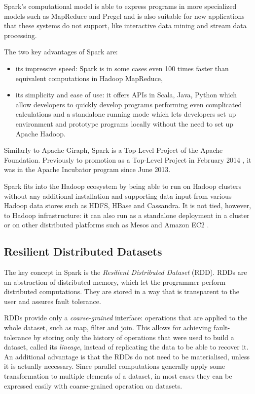 Spark's computational model is able to express programs in more specialized models such as MapReduce and Pregel and is also suitable for new applications that these systems do not support, like interactive data mining and stream data processing.

The two key advantages of Spark are:
\begin{itemize}
\item its impressive speed: Spark is in some cases even 100 times faster than equivalent computations in Hadoop MapReduce,
\item its simplicity and ease of use: it offers  APIs in Scala, Java, Python which allow developers to quickly develop programs performing even complicated calculations and a standalone running mode which lets developers set up environment and prototype programs locally without the need to set up Apache Hadoop.
\end{itemize}

Similarly to Apache Giraph, Spark is a Top-Level Project of the Apache Foundation. Previously to promotion as a Top-Level Project in February 2014 \cite{sparktoplevel}, it was in the Apache Incubator program since June 2013. 

Spark fits into the Hadoop ecosystem by being able to run on Hadoop clusters without any additional installation and supporting data input from various Hadoop data stores such as HDFS, HBase and Cassandra. It is not tied, however, to Hadoop infrastructure: it can also run as a standalone deployment in a cluster or on other distributed platforms such as Mesos \cite{mesos} and Amazon EC2 \cite{ec2}.

\subsection{Resilient Distributed Datasets}
The key concept in Spark is the \emph{Resilient Distributed Dataset} (RDD). RDDs are an abstraction of distributed memory, which let the programmer perform distributed computations. They are stored in a way that is transparent to the user and assures fault tolerance.

RDDs provide only a \emph{coarse-grained} interface: operations that are applied to the whole dataset, such as map, filter and join. This allows for achieving fault-tolerance by storing only the history of operations that were used to build a dataset, called its \emph{lineage}, instead of replicating the data to be able to recover it. An additional advantage is that the RDDs do not need to be materialised, unless it is actually necessary. Since parallel computations generally apply some transformation to multiple elements of a dataset, in most cases they can be expressed easily with coarse-grained operation on datasets.

